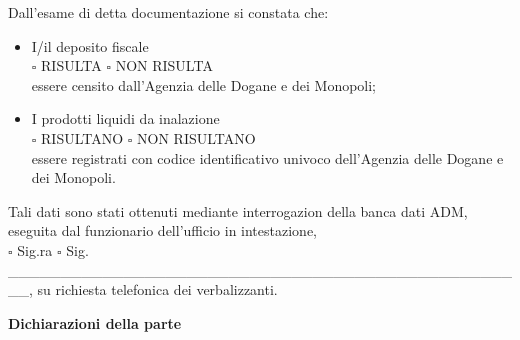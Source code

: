\documentclass[12pt]{article}
\begin{document}
Dall'esame di detta documentazione si constata che:
\begin{itemize}
    \item I/il deposito fiscale \\
    \begin{math}\square\end{math} RISULTA \begin{math}\square\end{math} NON RISULTA\\
    essere censito dall'Agenzia delle Dogane e dei Monopoli;
    \item I prodotti liquidi da inalazione \\
    \begin{math}\square\end{math} RISULTANO \begin{math}\square\end{math} NON RISULTANO\\
    essere registrati con codice identificativo univoco dell'Agenzia delle Dogane e dei Monopoli.
\end{itemize}

Tali dati sono stati ottenuti mediante interrogazion della banca dati ADM, eseguita dal funzionario dell'ufficio in intestazione, \\
    \begin{math}\square\end{math} Sig.ra \begin{math}\square\end{math} Sig.   \_\_\_\_\_\_\_\_\_\_\_\_\_\_\_\_\_\_\_\_\_\_\_\_\_\_\_\_\_\_\_\_\_\_\_\_\_\_\_\_\_\_\_\_\_\_\_\_\_\_, su richiesta telefonica dei verbalizzanti.

\newpage

\begin{center}
    \textbf{Dichiarazioni della parte}
\end{center}
\end{document}

